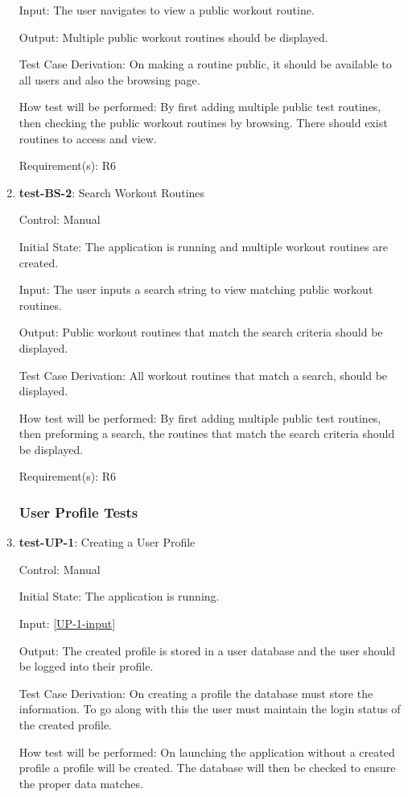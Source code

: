 \documentclass[12pt, titlepage]{article}
\begin{document}
\begin{enumerate}
		Input: The user navigates to view a public workout routine.
		
		Output: Multiple public workout routines should be displayed. 
		
		Test Case Derivation: On making a routine public, it should be available to all users and also the browsing page.
		
		How test will be performed: By first adding multiple public test routines, then checking the public workout routines by browsing. There should exist routines to access and view.
		
		Requirement(s): R6
		
		\item{\textbf{test-BS-2}}: Search Workout Routines
		
		Control: Manual
		
		Initial State: The application is running and multiple workout routines are created.
		
		Input: The user inputs a search string to view matching public workout routines.
		
		Output: Public workout routines that match the search criteria should be displayed. 
		
		Test Case Derivation: All workout routines that match a search, should be displayed.
		
		How test will be performed: By first adding multiple public test routines, then preforming a search, the routines that match the search criteria should be displayed.
		
		Requirement(s): R6
		
		\subsubsection{User Profile Tests}
		\item{\textbf{test-UP-1}}: Creating a User Profile
		
		Control: Manual
		
		Initial State: The application is running.
		
		Input: \ref{UP-1-input}
		
		Output: The created profile is stored in a user database and the user should be logged into their profile.
		
		Test Case Derivation: On creating a profile the database must store the information. To go along with this the user must maintain the login status of the created profile.
		
		How test will be performed: On launching the application without a created profile a profile will be created. The database will then be checked to ensure the proper data matches.
		

\end{enumerate}
\end{document}

